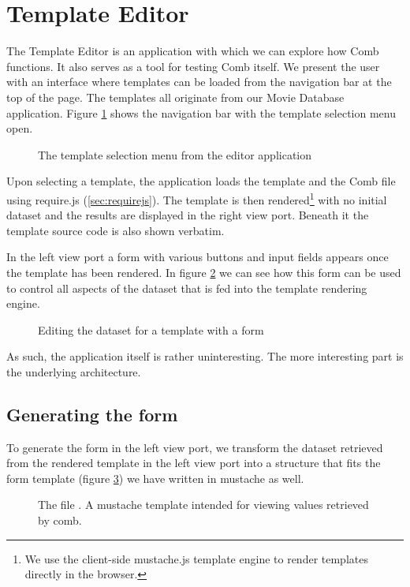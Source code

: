\documentclass[thesis.tex]{subfiles}
\begin{document}
\section{Template Editor}
The Template Editor is an application with which we can explore how Comb
functions.
It also serves as a tool for testing Comb itself.
We present the user with an interface where templates can be loaded from the
navigation bar at the top of the page. The templates all originate from our
Movie Database application. Figure \ref{fig:template-selection} shows the
navigation bar with the template selection menu open.
\begin{figure}
	\centering
	\caption{The template selection menu from the editor application}
	\label{fig:template-selection}
\end{figure}
Upon selecting a template, the application loads the template and the Comb file
using require.js (\ref{sec:requirejs}).
The template is then rendered\footnote{We use the client-side mustache.js
template engine to render templates directly in the browser.} with no initial
dataset and the results are displayed in the right view port.
Beneath it the template source code is also shown verbatim.

In the left view port a form with various buttons and input fields appears once
the template has been rendered. In figure \ref{fig:editor-form} we can see how
this form can be used to control all aspects of the dataset that is fed into
the template rendering engine.
\begin{figure}
	\centering
	\caption{Editing the dataset for a template with a form}
	\label{fig:editor-form}
\end{figure}

As such, the application itself is rather uninteresting. The more interesting
part is the underlying architecture.

\subsection{Generating the form}
To generate the form in the left view port, we transform the dataset retrieved
from the rendered template in the left view port into a structure that fits the
form template (figure \ref{fig:mustache.mustache}) we have written in mustache
as well.
\begin{figure}
	\centering
	
	\caption{The file . A mustache template intended for viewing values retrieved by comb.}
	\label{fig:mustache.mustache}
\end{figure}
\end{document}
